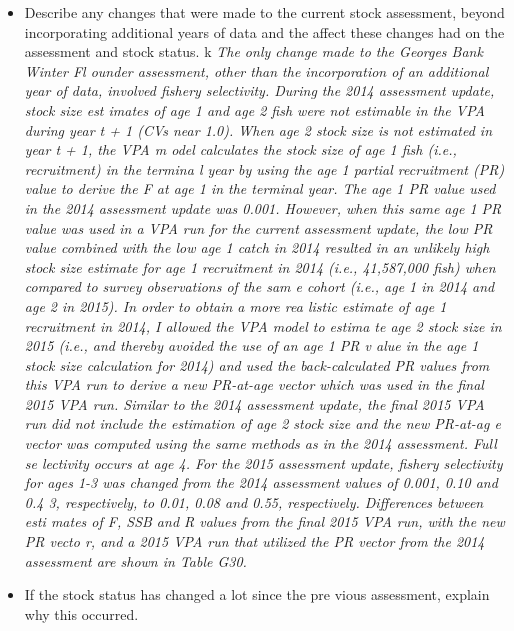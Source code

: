 {\begin{itemize}{}
{} \hspace*{0.5cm} \textit{Population projections for Georges Bank Winter Floun
der are reasonably well determined.} \item{}Describe any changes that were made
 to the current stock assessment, beyond incorporating additional years of data
 and the affect these changes had on the assessment and stock status. \linebrea
k{} \hspace*{0.5cm} \textit{ The only change made to the Georges Bank Winter Fl
ounder assessment, other than the incorporation of an additional year of data, 
involved fishery selectivity. During the 2014 assessment update, stock size est
imates of age 1 and age 2 fish were not estimable in the VPA during year t + 1 
(CVs near 1.0). When age 2 stock size is not estimated in year t + 1, the VPA m
odel calculates the stock size of age 1 fish (i.e., recruitment) in the termina
l year by using the age 1 partial recruitment (PR) value to derive the F at age
 1 in the terminal year. The age 1 PR value used in the 2014 assessment update 
was 0.001. However, when this same age 1 PR value was used in a VPA run for the
 current assessment update, the low PR value combined with the low age 1 catch 
in 2014 resulted in an unlikely high stock size estimate for age 1 recruitment 
in 2014 (i.e., 41,587,000 fish) when compared to survey observations of the sam
e cohort (i.e., age 1 in 2014 and age 2 in 2015). In order to obtain a more rea
listic estimate of age 1 recruitment in 2014, I allowed the VPA model to estima
te age 2 stock size in 2015 (i.e., and thereby avoided the use of an age 1 PR v
alue in the age 1 stock size calculation for 2014) and used the back-calculated
 PR values from this VPA run to derive a new PR-at-age vector which was used in
 the final 2015 VPA run. Similar to the 2014 assessment update, the final 2015 
VPA run did not include the estimation of age 2 stock size and the new PR-at-ag
e vector was computed using the same methods as in the 2014 assessment. Full se
lectivity occurs at age 4. For the 2015 assessment update, fishery selectivity 
for ages 1-3 was changed from the 2014 assessment values of 0.001, 0.10 and 0.4
3, respectively, to 0.01, 0.08 and 0.55, respectively. Differences between esti
mates of F, SSB and R values from the final 2015 VPA run, with the new PR vecto
r, and a 2015 VPA run that utilized the PR vector from the 2014 assessment are 
shown in Table G30.} \item{}If the stock status has changed a lot since the pre
vious assessment, explain why this occurred. \linebreak{} \hspace*{0.5cm} \text

\end{itemize}}

